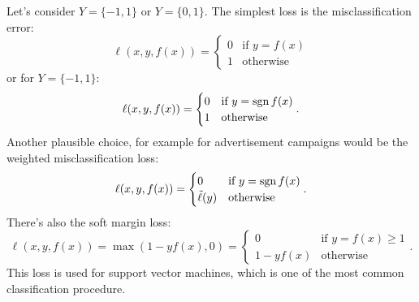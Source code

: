 \documentclass[../lecture-notes.tex]{subfiles}
\begin{document}
Let's consider $Y = \{ -1, 1 \}$ or $Y = \{ 0, 1 \}$.
The simplest loss is the misclassification error:
\[
	\ell(x, y, f(x)) = \begin{cases}
	0 & \text{if } y = f(x) \\
	1 & \text{otherwise}
	\end{cases}
\]
or for $Y = \{ -1, 1 \}$:
\[
	\ell(x, y, f(x)) = \begin{cases}
	0 & \text{if } y = \operatorname{sgn} f(x) \\
	1 & \text{otherwise}
	\end{cases}.
\]
Another plausible choice, for example for advertisement campaigns would be the weighted misclassification loss:
\[
	\ell(x, y, f(x)) = \begin{cases}
	0 & \text{if } y = \operatorname{sgn} f(x) \\
	\tilde{\ell}(y) & \text{otherwise}
	\end{cases}.
\]
There's also the soft margin loss:
\[
	\ell(x, y, f(x)) = \max(1 - yf(x), 0) = \begin{cases}
	0 & \text{if } y = f(x) \geq 1 \\
	1 - y f(x) & \text{otherwise}
	\end{cases}.
\]
This loss is used for support vector machines, which is one of the most common classification procedure.
\end{document}
